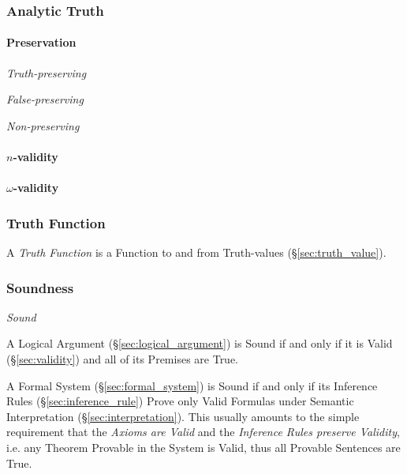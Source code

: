 \subsubsection{Analytic Truth}\label{sec:analytic_truth}

\paragraph{Preservation}\label{sec:preservation}\hfill

\emph{Truth-preserving}

\emph{False-preserving}

\emph{Non-preserving}



\paragraph{$n$-validity}\label{sec:n_validity}\hfill

\paragraph{$\omega$-validity}\label{sec:omega_validity}\hfill



\subsubsection{Truth Function}\label{sec:truth_function}

A \emph{Truth Function} is a Function to and from Truth-values
(\S\ref{sec:truth_value}).



\subsubsection{Soundness}\label{sec:soundness}

\emph{Sound}

A Logical Argument (\S\ref{sec:logical_argument}) is Sound if and only
if it is Valid (\S\ref{sec:validity}) and all of its Premises are
True.

A Formal System (\S\ref{sec:formal_system}) is Sound if and only if its
Inference Rules (\S\ref{sec:inference_rule}) Prove only Valid Formulas under
Semantic Interpretation (\S\ref{sec:interpretation}). This usually amounts to
the simple requirement that the \emph{Axioms are Valid} and the \emph{Inference
  Rules preserve Validity}, i.e. any Theorem Provable in the System is Valid,
thus all Provable Sentences are True.


